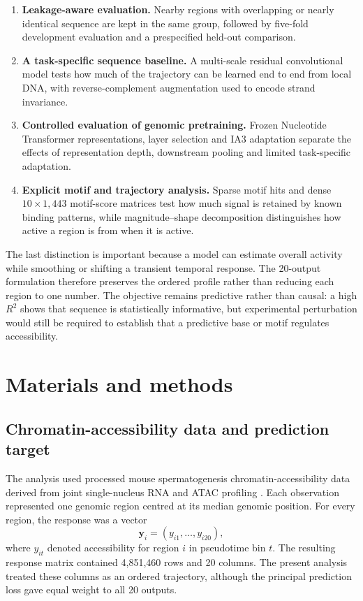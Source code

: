 \documentclass[a4paper,12pt]{article}
\begin{document}
\begin{enumerate}
\item \textbf{Leakage-aware evaluation.} Nearby regions with overlapping or nearly identical sequence are kept in the same group, followed by five-fold development evaluation and a prespecified held-out comparison.
\item \textbf{A task-specific sequence baseline.} A multi-scale residual convolutional model tests how much of the trajectory can be learned end to end from local DNA, with reverse-complement augmentation used to encode strand invariance.
\item \textbf{Controlled evaluation of genomic pretraining.} Frozen Nucleotide Transformer representations, layer selection and IA3 adaptation separate the effects of representation depth, downstream pooling and limited task-specific adaptation.
\item \textbf{Explicit motif and trajectory analysis.} Sparse motif hits and dense $10\times1{,}443$ motif-score matrices test how much signal is retained by known binding patterns, while magnitude--shape decomposition distinguishes how active a region is from when it is active.
\end{enumerate}

The last distinction is important because a model can estimate overall activity while smoothing or shifting a transient temporal response. The 20-output formulation therefore preserves the ordered profile rather than reducing each region to one number. The objective remains predictive rather than causal: a high $R^2$ shows that sequence is statistically informative, but experimental perturbation would still be required to establish that a predictive base or motif regulates accessibility.

\section{Materials and methods}

\subsection{Chromatin-accessibility data and prediction target}

The analysis used processed mouse spermatogenesis chromatin-accessibility data derived from joint single-nucleus RNA and ATAC profiling \citep{agarwal2026}. Each observation represented one genomic region centred at its median genomic position. For every region, the response was a vector
\[
\mathbf{y}_i=(y_{i1},\ldots,y_{i20}),
\]
where $y_{it}$ denoted accessibility for region $i$ in pseudotime bin $t$. The resulting response matrix contained 4,851,460 rows and 20 columns. The present analysis treated these columns as an ordered trajectory, although the principal prediction loss gave equal weight to all 20 outputs.
\end{document}
